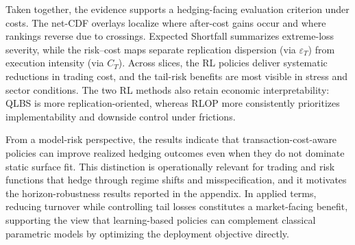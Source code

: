 Taken together, the evidence supports a hedging-facing evaluation criterion under costs.
The net-CDF overlays localize where after-cost gains occur and where rankings reverse due to crossings.
Expected Shortfall summarizes extreme-loss severity, while the risk--cost maps separate replication dispersion (via $\varepsilon_T$) from execution intensity
(via $C_T$).
Across slices, the RL policies deliver systematic reductions in trading cost, and the tail-risk benefits are most visible in stress and sector conditions.
The two RL methods also retain economic interpretability: QLBS is more replication-oriented, whereas RLOP more consistently prioritizes implementability and
downside control under frictions.

From a model-risk perspective, the results indicate that transaction-cost-aware policies can improve realized hedging outcomes even when they do not dominate
static surface fit.
This distinction is operationally relevant for trading and risk functions that hedge through regime shifts and misspecification, and it motivates the
horizon-robustness results reported in the appendix.
In applied terms, reducing turnover while controlling tail losses constitutes a market-facing benefit, supporting the view that learning-based policies can
complement classical parametric models by optimizing the deployment objective directly.

